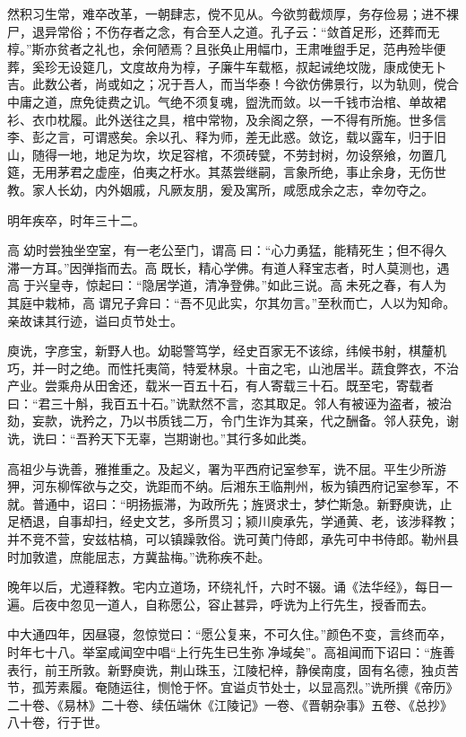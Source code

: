 \documentclass[12pt,UTF8]{ctexbook}
\begin{document}
然积习生常，难卒改革，一朝肆志，傥不见从。今欲剪截烦厚，务存俭易；进不裸尸，退异常俗；不伤存者之念，有合至人之道。孔子云：“敛首足形，还葬而无椁。”斯亦贫者之礼也，余何陋焉？且张奂止用幅巾，王肃唯盥手足，范冉殓毕便葬，奚珍无设筵几，文度故舟为椁，子廉牛车载柩，叔起诫绝坟陇，康成使无卜吉。此数公者，尚或如之；况于吾人，而当华泰！今欲仿佛景行，以为轨则，傥合中庸之道，庶免徒费之讥。气绝不须复魂，盥洗而敛。以一千钱市治棺、单故裙衫、衣巾枕履。此外送往之具，棺中常物，及余阁之祭，一不得有所施。世多信李、彭之言，可谓惑矣。余以孔、释为师，差无此惑。敛讫，载以露车，归于旧山，随得一地，地足为坎，坎足容棺，不须砖甓，不劳封树，勿设祭飨，勿置几筵，无用茅君之虚座，伯夷之杅水。其蒸尝继嗣，言象所绝，事止余身，无伤世教。家人长幼，内外姻戚，凡厥友朋，爰及寓所，咸愿成余之志，幸勿夺之。

明年疾卒，时年三十二。

高幼时尝独坐空室，有一老公至门，谓高曰：“心力勇猛，能精死生；但不得久滞一方耳。”因弹指而去。高既长，精心学佛。有道人释宝志者，时人莫测也，遇高于兴皇寺，惊起曰：“隐居学道，清净登佛。”如此三说。高未死之春，有人为其庭中栽柿，高谓兄子弇曰：“吾不见此实，尔其勿言。”至秋而亡，人以为知命。亲故诔其行迹，谥曰贞节处士。

庾诜，字彦宝，新野人也。幼聪警笃学，经史百家无不该综，纬候书射，棋釐机巧，并一时之绝。而性托夷简，特爱林泉。十亩之宅，山池居半。蔬食弊衣，不治产业。尝乘舟从田舍还，载米一百五十石，有人寄载三十石。既至宅，寄载者曰：“君三十斛，我百五十石。”诜默然不言，恣其取足。邻人有被诬为盗者，被治劾，妄款，诜矜之，乃以书质钱二万，令门生诈为其亲，代之酬备。邻人获免，谢诜，诜曰：“吾矜天下无辜，岂期谢也。”其行多如此类。

高祖少与诜善，雅推重之。及起义，署为平西府记室参军，诜不屈。平生少所游狎，河东柳恽欲与之交，诜距而不纳。后湘东王临荆州，板为镇西府记室参军，不就。普通中，诏曰：“明扬振滞，为政所先；旌贤求士，梦伫斯急。新野庾诜，止足栖退，自事却扫，经史文艺，多所贯习；颍川庾承先，学通黄、老，该涉释教；并不竞不营，安兹枯槁，可以镇躁敦俗。诜可黄门侍郎，承先可中书侍郎。勒州县时加敦遣，庶能屈志，方冀盐梅。”诜称疾不赴。

晚年以后，尤遵释教。宅内立道场，环绕礼忏，六时不辍。诵《法华经》，每日一遍。后夜中忽见一道人，自称愿公，容止甚异，呼诜为上行先生，授香而去。

中大通四年，因昼寝，忽惊觉曰：“愿公复来，不可久住。”颜色不变，言终而卒，时年七十八。举室咸闻空中唱“上行先生已生弥净域矣”。高祖闻而下诏曰：“旌善表行，前王所敦。新野庾诜，荆山珠玉，江陵杞梓，静侯南度，固有名德，独贞苦节，孤芳素履。奄随运往，恻怆于怀。宜谥贞节处士，以显高烈。”诜所撰《帝历》二十卷、《易林》二十卷、续伍端休《江陵记》一卷、《晋朝杂事》五卷、《总抄》八十卷，行于世。
\end{document}
